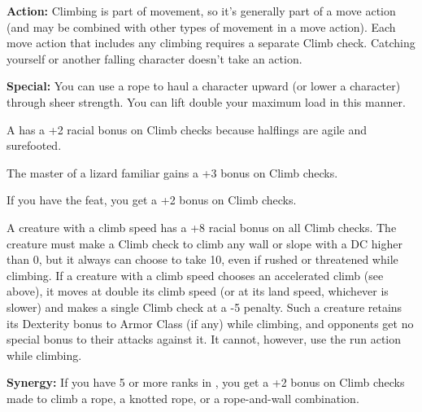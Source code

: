 \textbf{Action:} Climbing is part of movement, so it's generally part of a move 
action (and may be combined with other types of movement in a move action). Each 
move action that includes any climbing requires a separate Climb check. Catching 
yourself or another falling character doesn't take an action.

\textbf{Special:} You can use a rope to haul a character upward (or lower a character) 
through sheer strength. You can lift double your maximum load in this manner.

A  has a +2 racial bonus on Climb checks because halflings are agile and 
surefooted.

The master of a lizard familiar gains a +3 bonus on Climb checks.

If you have the  feat, you get a +2 bonus on Climb checks.

A creature with a climb speed has a +8 racial bonus on all Climb checks. The creature 
must make a Climb check to climb any wall or slope with a DC higher than 0, but 
it always can choose to take 10, even if rushed or threatened while climbing. If 
a creature with a climb speed chooses an accelerated climb (see above), it moves 
at double its climb speed (or at its land speed, whichever is slower) and makes 
a single Climb check at a -5 penalty. Such a creature retains its Dexterity bonus 
to Armor Class (if any) while climbing, and opponents get no special bonus to their 
attacks against it. It cannot, however, use the run action while climbing.

\textbf{Synergy:} If you have 5 or more ranks in , you get a +2 bonus on 
Climb checks made to climb a rope, a knotted rope, or a rope-and-wall combination.
